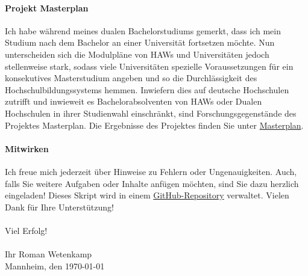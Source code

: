 \documentclass[11pt,a4paper]{scrreport}
\theoremstyle{remark}
\theoremstyle{definition}
\begin{document}
\paragraph{Projekt {\glqq}Masterplan{\grqq}} Ich habe während meines dualen Bachelorstudiums gemerkt, dass ich mein Studium nach dem Bachelor an einer Universität fortsetzen möchte. Nun unterscheiden sich die Modulpläne von HAWs und Universitäten jedoch stellenweise stark, sodass viele Universitäten spezielle Voraussetzungen für ein konsekutives Masterstudium angeben und so die Durchlässigkeit des Hochschulbildungssystems hemmen. Inwiefern dies auf deutsche Hochschulen zutrifft und inwieweit es Bachelorabsolventen von HAWs oder Dualen Hochschulen in ihrer Studienwahl einschränkt, sind Forschungsgegenstände des Projektes {\glqq}Masterplan{\grqq}. Die Ergebnisse des Projektes finden Sie unter \href{http://masterplan.rwetenkamp.de}{Masterplan}.
\paragraph{Mitwirken} Ich freue mich jederzeit über Hinweise zu Fehlern oder Ungenauigkeiten. Auch, falls Sie weitere Aufgaben oder Inhalte anfügen möchten, sind Sie dazu herzlich eingeladen! Dieses Skript wird in einem \href{https://www.github.com/RWetenkamp/theoplus}{GitHub-Repository} verwaltet. Vielen Dank für Ihre Unterstützung!
\\\\
Viel Erfolg! \\\\
Ihr Roman Wetenkamp \\
Mannheim, den \today
\pagebreak
\end{document}
